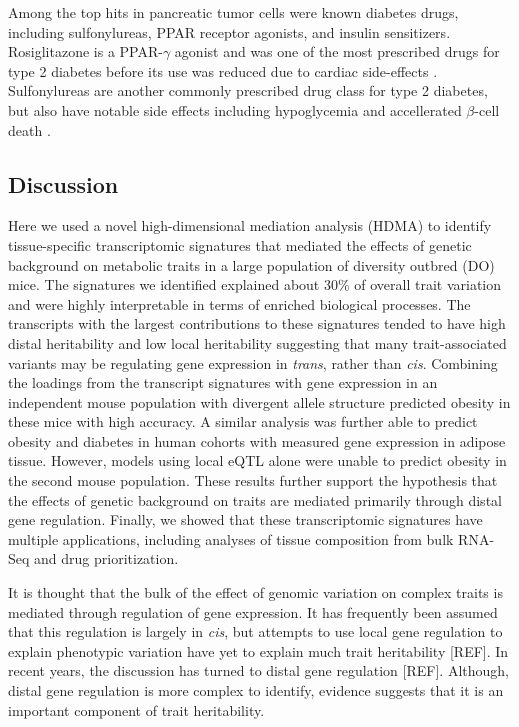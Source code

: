 \documentclass[
]{article}
\begin{document}
Among the top hits in pancreatic tumor cells were known diabetes drugs,
including sulfonylureas, PPAR receptor agonists, and insulin
sensitizers. Rosiglitazone is a PPAR-\(\gamma\) agonist and was one of
the most prescribed drugs for type 2 diabetes before its use was reduced
due to cardiac side-effects \cite{pmid21190462}. Sulfonylureas are
another commonly prescribed drug class for type 2 diabetes, but also
have notable side effects including hypoglycemia and accellerated
\(\beta\)-cell death \cite{pmid16631807}.

\subsection{Discussion}\label{discussion}

Here we used a novel high-dimensional mediation analysis (HDMA) to
identify tissue-specific transcriptomic signatures that mediated the
effects of genetic background on metabolic traits in a large population
of diversity outbred (DO) mice. The signatures we identified explained
about 30\% of overall trait variation and were highly interpretable in
terms of enriched biological processes. The transcripts with the largest
contributions to these signatures tended to have high distal
heritability and low local heritability suggesting that many
trait-associated variants may be regulating gene expression in
\textit{trans}, rather than \textit{cis}. Combining the loadings from
the transcript signatures with gene expression in an independent mouse
population with divergent allele structure predicted obesity in these
mice with high accuracy. A similar analysis was further able to predict
obesity and diabetes in human cohorts with measured gene expression in
adipose tissue. However, models using local eQTL alone were unable to
predict obesity in the second mouse population. These results further
support the hypothesis that the effects of genetic background on traits
are mediated primarily through distal gene regulation. Finally, we
showed that these transcriptomic signatures have multiple applications,
including analyses of tissue composition from bulk RNA-Seq and drug
prioritization.

It is thought that the bulk of the effect of genomic variation on
complex traits is mediated through regulation of gene expression. It has
frequently been assumed that this regulation is largely in \textit{cis},
but attempts to use local gene regulation to explain phenotypic
variation have yet to explain much trait heritability {[}REF{]}. In
recent years, the discussion has turned to distal gene regulation
{[}REF{]}. Although, distal gene regulation is more complex to identify,
evidence suggests that it is an important component of trait
heritability.
\end{document}
